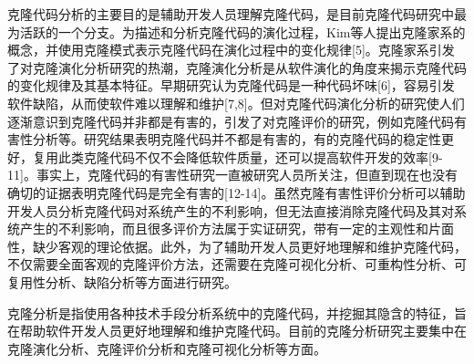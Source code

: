 

克隆代码分析的主要目的是辅助开发人员理解克隆代码，是目前克隆代码研究中最为活跃的一个分支。为描述和分析克隆代码的演化过程，Kim等人提出克隆家系的概念，并使用克隆模式表示克隆代码在演化过程中的变化规律[5]。克隆家系引发了对克隆演化分析研究的热潮，克隆演化分析是从软件演化的角度来揭示克隆代码的变化规律及其基本特征。早期研究认为克隆代码是一种代码坏味[6]，容易引发软件缺陷，从而使软件难以理解和维护[7,8]。但对克隆代码演化分析的研究使人们逐渐意识到克隆代码并非都是有害的，引发了对克隆评价的研究，例如克隆代码有害性分析等。研究结果表明克隆代码并不都是有害的，有的克隆代码的稳定性更好，复用此类克隆代码不仅不会降低软件质量，还可以提高软件开发的效率[9-11]。事实上，克隆代码的有害性研究一直被研究人员所关注，但直到现在也没有确切的证据表明克隆代码是完全有害的[12-14]。虽然克隆有害性评价分析可以辅助开发人员分析克隆代码对系统产生的不利影响，但无法直接消除克隆代码及其对系统产生的不利影响，而且很多评价方法属于实证研究，带有一定的主观性和片面性，缺少客观的理论依据。此外，为了辅助开发人员更好地理解和维护克隆代码，不仅需要全面客观的克隆评价方法，还需要在克隆可视化分析、可重构性分析、可复用性分析、缺陷分析等方面进行研究。

克隆分析是指使用各种技术手段分析系统中的克隆代码，并挖掘其隐含的特征，旨在帮助软件开发人员更好地理解和维护克隆代码。目前的克隆分析研究主要集中在克隆演化分析、克隆评价分析和克隆可视化分析等方面。



